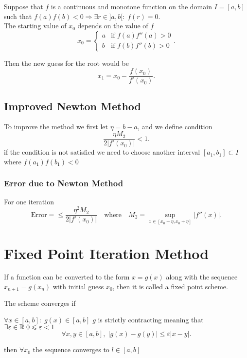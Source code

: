 \documentclass{report}
\begin{document}
Suppose that $f$ is a continuous and monotone function on the domain $I = [a,b]$ such that $f(a)f(b)<0\Rightarrow \exists r \in]a,b[:\;f(r)=0$.\\

The starting value of $x_0$ depends on the value of $f$
\[
	x_0 = \begin{cases}
		a & \text{if }f(a)f''(a)>0 \\
		b & \text{if }f(b)f''(b)>0
	\end{cases}
	.\]

Then the new guess for the root would be
\[
	x_1 = x_0 - \frac{f(x_0)}{f'(x_0)}
	.\]

\subsection{Improved Newton Method}
To improve the method we first let $\eta = b-a$, and we define condition
\[
	\frac{\eta M_2}{2|f'(x_0)|}<1
	.\]
if the condition is not satisfied we need to choose another interval $[a_1,b_1]\subset I$ where $f(a_1)f(b_1)<0$

\subsubsection{Error due to Newton Method}

For one iteration
\[
	\text{Error} = \leq \frac{\eta^2 M_2}{2|f'(x_0)|} \quad\text{where}\quad M_2 = \sup_{x\in[x_0-\eta,x_0+\eta]} |f''(x)|
	.\]

\section{Fixed Point Iteration Method}
If a function can be converted to the form $x=g(x)$ along with the sequence $x_{n+1} = g(x_n)$ with initial guess $x_0$, then it is called a fixed point scheme.

The scheme converges if
\begin{itemize}
	\ii $\forall x \in [a,b]:\; g(x)\in[a,b]$
	\ii $g$ is strictly contracting meaning that $\exists \varepsilon \in \RR\; 0\leq \varepsilon < 1$
	\[
		\forall x,y \in[a,b],\; |g(x)-g(y)|\leq \varepsilon|x-y|
		.\]
\end{itemize}
then $\forall x_0$ the sequence converges to $l\in[a,b]$

\nt{
	\[
		\sup_{x\in[a,b]}|g'(x)| = L<1\Rightarrow g(x)\text{ is strictly contracting}
		.\]
}

\end{document}
